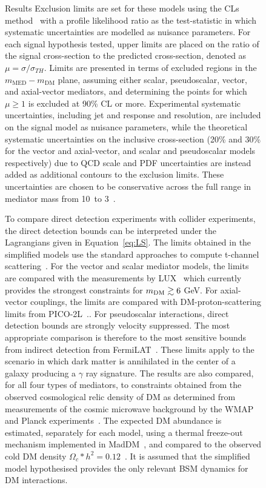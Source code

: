 \begin{figure}[hbtp]
\begin{section}{Results}
Exclusion limits are set for these models using the CLs method~\cite{cls} with a
profile likelihood ratio as the test-statistic in which systematic uncertainties
are modelled as nuisance parameters.  For each signal hypothesis tested, upper
limits are placed on the ratio of the signal cross-section to the predicted
cross-section, denoted as $\mu=\sigma/\sigma_{TH}$. Limits are presented in
terms of excluded regions in the $m_{\mathrm{MED}}-m_{\textrm{DM}}$ plane,
assuming either scalar, pseudoscalar, vector, and axial-vector mediators, and
determining the points for which $\mu\ge1$ is excluded at 90\% CL or more.
Experimental systematic uncertainties, including jet and \ETm response and
resolution, are included on the signal model as nuisance parameters, while the
theoretical systematic uncertainties on the inclusive cross-section (20\% and
30\% for the vector and axial-vector, and scalar and pseudoscalar models
respectively) due to QCD scale and PDF uncertainties are instead added as
additional contours to the exclusion limits. These uncertainties are chosen to
be conservative across the full range in mediator mass from 10~\GeV to 3~\TeV.

To compare direct detection experiments with collider experiments, the direct
detection bounds can be interpreted under the Lagrangians given in
Equation~\ref{eq:LS}. The limits obtained in the simplified models use the
standard approaches to compute t-channel
scattering~\cite{Kurylov:2003ra,Hisano:2010ct,
Cheung:2013pfa,Buchmueller:2014yoa}.  For the vector and scalar mediator models,
the limits are compared with the measurements by
LUX~\cite{Akerib:2012ys,Akerib:2013tjd,Szydagis:2014xog} which currently
provides the strongest constraints for $m_{\rm{DM}} \gtrsim 6$ GeV. For
axial-vector couplings, the limits are compared with DM-proton-scattering limits
from PICO-2L~\cite{Amole:2015lsj}..  For pseudoscalar interactions, direct
detection bounds are strongly velocity suppressed.  The most appropriate
comparison is therefore to the most sensitive bounds from indirect detection
from FermiLAT~\cite{Ackermann:2011wa,Abdo:2010ex}.  These limits apply to the
scenario in which dark matter is annihilated in the center of a galaxy producing
a $\gamma$ ray signature.  The results are also compared, for all four types of
mediators, to constraints obtained from the observed cosmological relic density
of DM as determined from measurements of the cosmic microwave background by the
WMAP and Planck experiments~\cite{Bennett:2003ba,Planck:2006aa}. The expected DM
abundance is estimated, separately for each model, using a thermal freeze-out
mechanism implemented in MadDM~\cite{Backovic:2013dpa}, and compared to the
observed cold DM density $\Omega_c*h^2=0.12$~\cite{Ade:2013zuv}.  It is assumed
that the simplified model hypothesised provides the only relevant BSM dynamics
for DM interactions.


\end{section}
\end{figure}
